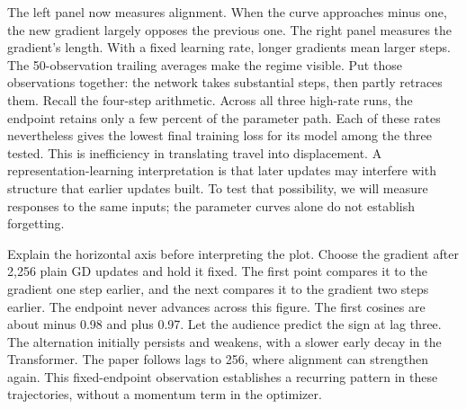 {
}
{The left panel now measures alignment. When the curve approaches minus one, the new gradient largely opposes the previous one. The right panel measures the gradient's length. With a fixed learning rate, longer gradients mean larger steps. The 50-observation trailing averages make the regime visible. Put those observations together: the network takes substantial steps, then partly retraces them. Recall the four-step arithmetic. Across all three high-rate runs, the endpoint retains only a few percent of the parameter path. Each of these rates nevertheless gives the lowest final training loss for its model among the three tested. This is inefficiency in translating travel into displacement. A representation-learning interpretation is that later updates may interfere with structure that earlier updates built. To test that possibility, we will measure responses to the same inputs; the parameter curves alone do not establish forgetting.}

{
}
{Explain the horizontal axis before interpreting the plot. Choose the gradient after 2,256 plain GD updates and hold it fixed. The first point compares it to the gradient one step earlier, and the next compares it to the gradient two steps earlier. The endpoint never advances across this figure. The first cosines are about minus 0.98 and plus 0.97. Let the audience predict the sign at lag three. The alternation initially persists and weakens, with a slower early decay in the Transformer. The paper follows lags to 256, where alignment can strengthen again. This fixed-endpoint observation establishes a recurring pattern in these trajectories, without a momentum term in the optimizer.}

